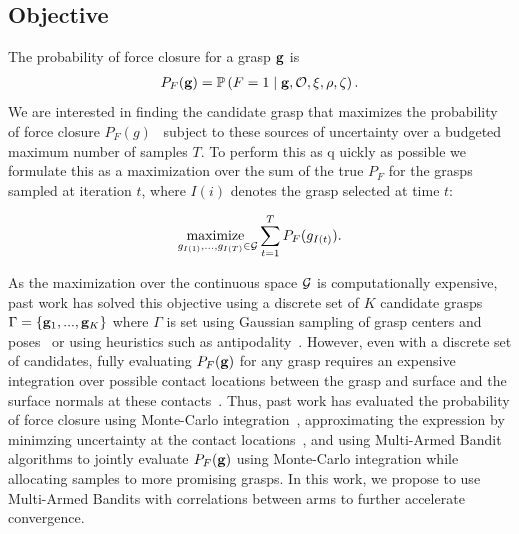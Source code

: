 \subsection{Objective}
The probability of force closure for a grasp $\mathbf{g}$ is
\begin{align*}
	P_F(\mathbf{g}) = \mathbb{P}\left(F = 1 \mid \mathbf{g}, \mathcal{O}, \xi, \rho, \zeta \right).
\end{align*}
\noindent We are interested in finding the candidate grasp that maximizes the probability of force closure $P_F(g)$~\cite{kim2012physically, laskey2015bandits, mahler2015gp, weisz2012pose} subject to these sources of uncertainty over a budgeted maximum number of samples $T$.
To perform this as q	uickly as possible we formulate this as a maximization over the sum of the true $P_F$ for the grasps sampled at iteration $t$, where $I(i)$ denotes the grasp selected at time $t$:

\vspace{-2ex}
\begin{align}
	\underset{g_{I(1)}, ..., g_{I(T)} \in \mathcal{G}}{\text{maximize }} \sum \limits_{t=1}^T P_F(g_{I(t)}). \label{eq:objective}
\end{align}

As the maximization over the continuous space $\mathcal{G}$ is computationally expensive, past work has solved this objective using a discrete set of $K$ candidate grasps $\Gamma = \left\{ \mathbf{g}_1, ..., \mathbf{g}_K \right\}$ where $\Gamma$ is set using Gaussian sampling of grasp centers and poses~\cite{laskey2015bandits} or using heuristics such as antipodality~\cite{mahler2015opt}.
However, even with a discrete set of candidates, fully evaluating $P_F(\mathbf{g})$ for any grasp requires an expensive integration over possible contact locations between the grasp and surface and the surface normals at these contacts~\cite{mahler2015gp}.
Thus, past work has evaluated the probability of force closure using Monte-Carlo integration~\cite{kehoe2012estimating, kehoe2012toward, weisz2012pose}, approximating the expression by minimzing uncertainty at the contact locations~\cite{mahler2015gp}, and using Multi-Armed Bandit algorithms to jointly evaluate $P_F(\mathbf{g})$ using Monte-Carlo integration while allocating samples to more promising grasps.
In this work, we propose to use Multi-Armed Bandits with correlations between arms to further accelerate convergence.

